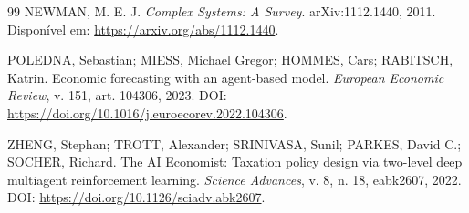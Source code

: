 \documentclass[12pt,a4paper]{article}
\begin{document}
\begin{thebibliography}{99}
 NEWMAN, M. E. J. \emph{Complex Systems: A Survey}. arXiv:1112.1440, 2011. Disponível em: \url{https://arxiv.org/abs/1112.1440}.

 POLEDNA, Sebastian; MIESS, Michael Gregor; HOMMES, Cars; RABITSCH, Katrin. Economic forecasting with an agent-based model. \emph{European Economic Review}, v. 151, art. 104306, 2023. DOI: \url{https://doi.org/10.1016/j.euroecorev.2022.104306}.

 ZHENG, Stephan; TROTT, Alexander; SRINIVASA, Sunil; PARKES, David C.; SOCHER, Richard. The AI Economist: Taxation policy design via two-level deep multiagent reinforcement learning. \emph{Science Advances}, v. 8, n. 18, eabk2607, 2022. DOI: \url{https://doi.org/10.1126/sciadv.abk2607}.

\end{thebibliography}
\end{document}
